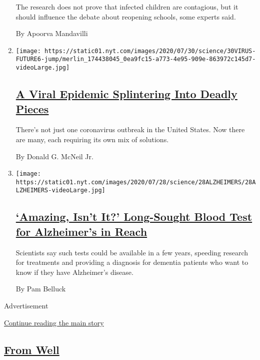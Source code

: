\begin{enumerate}
  The research does not prove that infected children are contagious, but
  it should influence the debate about reopening schools, some experts
  said.

  By Apoorva Mandavilli
\item
  \texttt{[image: https://static01.nyt.com/images/2020/07/30/science/30VIRUS-FUTURE6-jump/merlin\_174438045\_0ea9fc15-a773-4e95-909e-863972c145d7-videoLarge.jpg]}

  \hypertarget{a-viral-epidemic-splintering-into-deadly-pieces}{%
  \subsection{\texorpdfstring{\href{/2020/07/29/health/coronavirus-future-america.html}{A
  Viral Epidemic Splintering Into Deadly
  Pieces}}{A Viral Epidemic Splintering Into Deadly Pieces}}\label{a-viral-epidemic-splintering-into-deadly-pieces}}

  There's not just one coronavirus outbreak in the United States. Now
  there are many, each requiring its own mix of solutions.

  By Donald G. McNeil Jr.
\item
  \texttt{[image: https://static01.nyt.com/images/2020/07/28/science/28ALZHEIMERS/28ALZHEIMERS-videoLarge.jpg]}

  \hypertarget{amazing-isnt-it-long-sought-blood-test-for-alzheimers-in-reach}{%
  \subsection{\texorpdfstring{\href{/2020/07/28/health/alzheimers-blood-test.html}{`Amazing,
  Isn't It?' Long-Sought Blood Test for Alzheimer's in
  Reach}}{`Amazing, Isn't It?' Long-Sought Blood Test for Alzheimer's in Reach}}\label{amazing-isnt-it-long-sought-blood-test-for-alzheimers-in-reach}}

  Scientists say such tests could be available in a few years, speeding
  research for treatments and providing a diagnosis for dementia
  patients who want to know if they have Alzheimer's disease.

  By Pam Belluck
\end{enumerate}

Advertisement

\protect\hyperlink{after-mid1}{Continue reading the main story}

\hypertarget{from-well}{%
\subsection{\texorpdfstring{\href{/section/well}{From
Well}}{From Well}}\label{from-well}}

